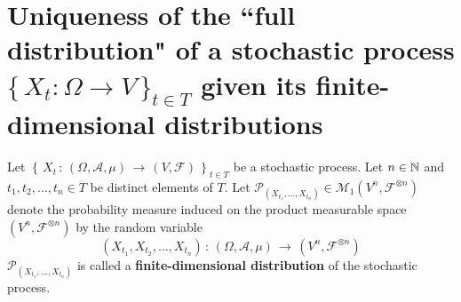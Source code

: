 

\section{Uniqueness of the ``full distribution" of a stochastic process
$\{\,X_{t} : \Omega \longrightarrow V\,\}_{t\in T}$ given
its finite-dimensional distributions}
\setcounter{theorem}{0}
\setcounter{equation}{0}

\begin{definition}
\mbox{}\vskip 0cm
\noindent
Let $\left\{\,X_{t}\,:\,(\Omega,\mathcal{A},\mu)\,\longrightarrow\,(V,\mathcal{F})\,\right\}_{t \in T}$
be a stochastic process.
Let $n \in \mathbb{N}$ and $t_{1},t_{2},\ldots,t_{n} \in T$ be distinct elements of $T$.
Let
$\mathcal{P}_{\left(X_{t_{1}},\ldots,X_{t_{n}}\right)} \in \mathcal{M}_{1}\!\left(V^{n},\mathcal{F}^{\otimes n}\right)$
denote the probability measure
induced on the product measurable space
$\left(V^{n},\mathcal{F}^{\otimes n}\right)$
by the random variable
\begin{equation*}
\left(X_{t_{1}},X_{t_{2}},\ldots,X_{t_{n}}\right)
\,:\, \left(\Omega,\mathcal{A},\mu\right) \,\longrightarrow\, \left(V^{n},\mathcal{F}^{\otimes n}\right)
\end{equation*}
$\mathcal{P}_{\left(X_{t_{1}},\ldots,X_{t_{n}}\right)}$
is called a \textbf{finite-dimensional distribution} of the stochastic process.
\end{definition}

